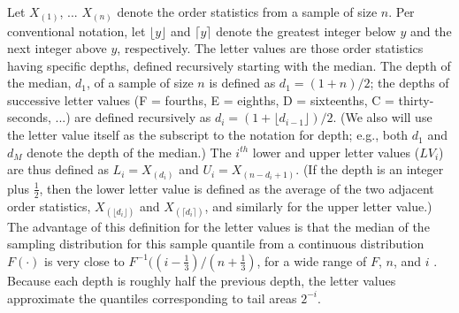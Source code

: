 \documentclass[oneside]{article}
\begin{document}
Let $X_{(1)}$, ... $X_{(n)}$ denote the order statistics from a sample of size $n$. Per conventional notation, let $\lfloor y \rfloor$ and $\lceil y \rceil$ denote the greatest integer below $y$ and the next integer above $y$, respectively. The letter values are those order statistics having specific depths, defined recursively starting with the median. The depth of the median, $d_1$, of a sample of size $n$ is defined as $d_1 = (1 + n )/2$; the depths of successive letter values (F = fourths, E = eighths, D = sixteenths, C = thirty-seconds, ...) are defined recursively as $d_i = (1 + \lfloor d_{i-1} \rfloor)/2$. (We also will use the letter value itself as the subscript to the notation for depth; e.g., both $d_1$ and $d_M$ denote the depth of the median.) The $i^{th}$ lower and upper letter values ($LV_i$) are thus defined as $L_i = X_{(d_i)}$ and $U_i = X_{(n - d_i + 1)}$. (If the depth is an integer plus $\frac{1}{2}$, then the lower letter value is defined as the average of the two adjacent order statistics, $X_{(\lfloor d_i \rfloor)}$ and $X_{(\lceil d_i \rceil)}$, and similarly for the upper letter value.) The advantage of this definition for the letter values is that the median of the sampling distribution for this sample quantile from a continuous distribution $F(\cdot)$ is very close to $F^{-1} ((i - \frac{1}{3})/(n + \frac{1}{3})$, for a wide range of $F$, $n$, and $i$ \citep{dchlv}. Because each depth is roughly half the previous depth, the letter values approximate the quantiles corresponding to tail areas $2^{-i}$.
\end{document}
